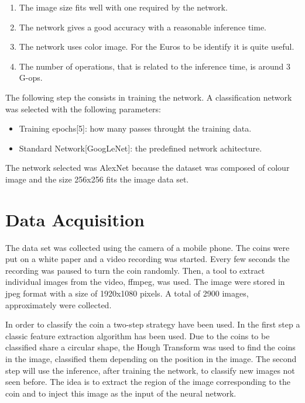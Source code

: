 \documentclass[10pt,journal,compsoc]{IEEEtran}
\begin{document}
\begin{enumerate}
	\item The image size fits well with one required by the network.
	\item The network gives a good accuracy with a reasonable inference time.
	\item The network uses color image. For the Euros to be identify it is quite useful.
	\item The number of operations, that is related to the inference time, is around 3 G-ops.
\end{enumerate}
\cite{analysisdnn}

The following step the consists in training the network. A classification network was selected with the following parameters:

\begin{itemize}
	\item Training epochs[5]: how many passes throught the training data.
	\item Standard Network[GoogLeNet]: the predefined network achitecture.
\end{itemize}

The network selected was AlexNet because the dataset was composed of colour image and the size 256x256 fits the image data set. \cite{udacity} \cite{deeplearning}
		
\section{Data Acquisition}

The data set was collected using the camera of a mobile phone. The coins were put on a white paper and a video recording was started. Every few seconds the recording was paused to turn the coin randomly. Then, a tool to extract individual images from the video, ffmpeg, was used. The image were stored in jpeg format with a size of 1920x1080 pixels. A total of 2900 images, approximately were collected.

In order to classify the coin a two-step strategy have been used. In the first step a classic feature extraction algorithm has been used. Due to the coins to be classified share a circular shape, the Hough Transform was used to find the coins in the image, classified them depending on the position in the image. The second step will use the inference, after training the network, to classify new images not seen before. The idea is to extract the region of the image corresponding to the coin and to inject this image as the input of the neural network.
\end{document}
